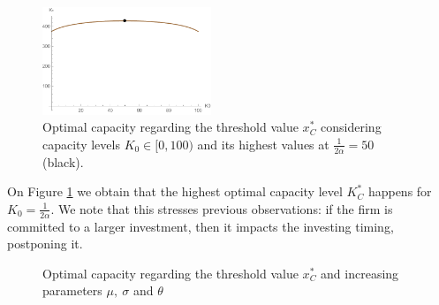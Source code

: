 \begin{figure}[!htb]
	\centering
	\includegraphics[width=0.45\textwidth]{Prob2_CapOpt/koptx_k0.pdf}
	\caption{Optimal capacity regarding the threshold value $x^*_C$ considering capacity levels $K_0 \in [0, 100)$ and its highest values at $\frac{1}{2 \alpha}=50$ (black).}
	\label{fig:2_k0}
\end{figure}

On Figure \ref{fig:2_k0} we obtain that the highest optimal capacity level $K^*_C$ happens for $K_0=\frac{1}{2 \alpha}$.
We note that this stresses previous observations: if the firm is committed to a larger investment, then it impacts the investing timing, postponing it.

\vspace{0.5cm}

\begin{figure}[!htb]
	\begin{subfigmatrix}{3}
	\end{subfigmatrix}
	\caption{Optimal capacity regarding the threshold value $x^*_C$ and increasing parameters $\mu, \ \sigma$ and $\theta$}
	\label{fig:2_k1}
\end{figure}

